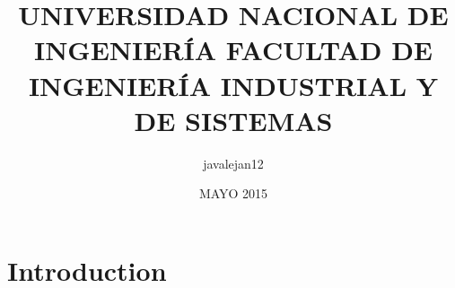 \documentclass{article}
\title{UNIVERSIDAD NACIONAL DE INGENIERÍA
FACULTAD DE INGENIERÍA INDUSTRIAL Y DE SISTEMAS
}
\author{javalejan12 }
\date{MAYO 2015}
\begin{document}
\maketitle

\section{Introduction}
\end{document}
